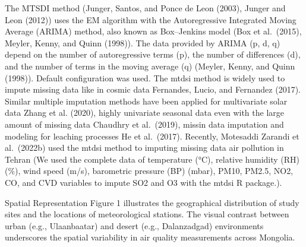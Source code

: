 \documentclass[
  11pt,
]{article}
\begin{document}
The MTSDI method (Junger, Santos, and Ponce de Leon (2003), Junger and
Leon (2012)) uses the EM algorithm with the Autoregressive Integrated
Moving Average (ARIMA) method, also known as Box--Jenkins model (Box et
al.~(2015), Meyler, Kenny, and Quinn (1998)). The data provided by ARIMA
(p, d, q) depend on the number of autoregressive terms (p), the number
of differences (d), and the number of terms in the moving average (q)
(Meyler, Kenny, and Quinn (1998)). Default configuration was used. The
mtdsi method is widely used to impute missing data like in cosmic data
Fernandes, Lucio, and Fernandez (2017). Similar multiple imputation
methods have been applied for multivariate solar data Zhang et al.
(2020), highly univariate seasonal data even with the large amount of
missing data Chaudhry et al.~(2019), missin data imputation and modeling
for leaching processes He et al.~(2017). Recently, Motesaddi Zarandi et
al.~(2022b) used the mtdsi method to imputing missing data air pollution
in Tehran (We used the complete data of temperature (°C), relative
humidity (RH) (\%), wind speed (m/s), barometric pressure (BP) (mbar),
PM10, PM2.5, NO2, CO, and CVD variables to impute SO2 and O3 with the
mtdsi R package.).

Spatial Representation Figure 1 illustrates the geographical
distribution of study sites and the locations of meteorological
stations. The visual contrast between urban (e.g., Ulaanbaatar) and
desert (e.g., Dalanzadgad) environments underscores the spatial
variability in air quality measurements across Mongolia.

\newpage
\end{document}
